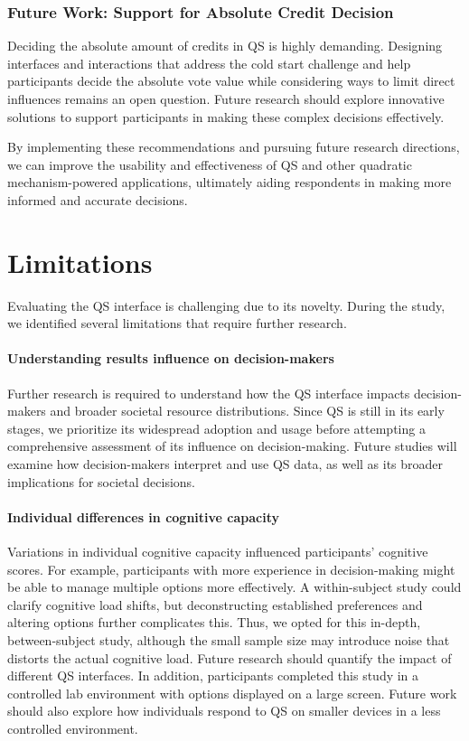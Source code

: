 \subsubsection{Future Work: Support for Absolute Credit Decision}
Deciding the absolute amount of credits in QS is highly demanding. Designing interfaces and interactions that address the cold start challenge and help participants decide the absolute vote value while considering ways to limit direct influences remains an open question. Future research should explore innovative solutions to support participants in making these complex decisions effectively.

By implementing these recommendations and pursuing future research directions, we can improve the usability and effectiveness of QS and other quadratic mechanism-powered applications, ultimately aiding respondents in making more informed and accurate decisions.

\section{Limitations}
\label{sec:limitations}
Evaluating the QS interface is challenging due to its novelty. During the study, we identified several limitations that require further research.

\paragraph{Understanding results influence on decision-makers}
Further research is required to understand how the QS interface impacts decision-makers and broader societal resource distributions. Since QS is still in its early stages, we prioritize its widespread adoption and usage before attempting a comprehensive assessment of its influence on decision-making. Future studies will examine how decision-makers interpret and use QS data, as well as its broader implications for societal decisions.

\paragraph{Individual differences in cognitive capacity}
Variations in individual cognitive capacity influenced participants' cognitive scores. For example, participants with more experience in decision-making might be able to manage multiple options more effectively. A within-subject study could clarify cognitive load shifts, but deconstructing established preferences and altering options further complicates this. Thus, we opted for this in-depth, between-subject study, although the small sample size may introduce noise that distorts the actual cognitive load. Future research should quantify the impact of different QS interfaces. In addition, participants completed this study in a controlled lab environment with options displayed on a large screen. Future work should also explore how individuals respond to QS on smaller devices in a less controlled environment.


